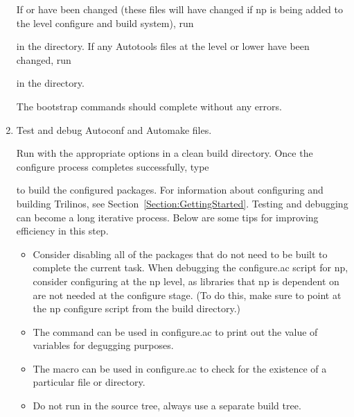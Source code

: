 \documentclass[12pt,relax]{TrilinosDevGuide}
\begin{document}
\begin{enumerate}
If  or 
 have been changed (these files 
will have changed if np is being added to the  level 
configure and build system), run 


in the  directory.  If any Autotools files at the 
 level or lower have been changed, run 


in the  directory.

The bootstrap commands should complete without any errors.

\item Test and debug Autoconf and Automake files.

Run  with the appropriate options in a clean build 
directory.  Once the configure process completes successfully, type 


to build the configured packages.  For information about configuring and 
building Trilinos, see Section~\ref{Section:GettingStarted}.  Testing and 
debugging can become a long iterative process.  Below are some tips for 
improving efficiency in this step.  

\begin{itemize}

\item Consider disabling all of the packages that do not need to be built to 
complete the current task.  When debugging the configure.ac script for np, 
consider configuring at the np level, as libraries that np is dependent on are 
not needed at the configure stage.  (To do this, make sure to point at the np 
configure script from the build directory.)

\item The  command can be used in configure.ac to 
print out the value of variables for degugging purposes.

\item The  macro can be used in configure.ac to 
check for the existence of a particular file or directory.

\item Do not run  in the source tree, always use a 
separate build tree.


\end{itemize}
\end{enumerate}
\end{document}
